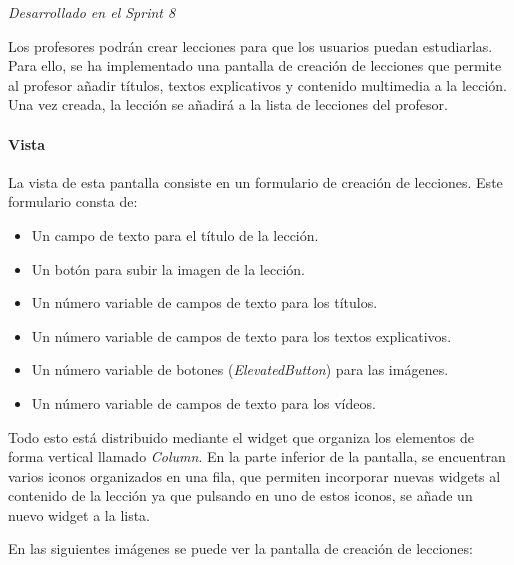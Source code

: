 \textit{Desarrollado en el Sprint 8}

Los profesores podrán crear lecciones para que los usuarios puedan estudiarlas. Para ello, se ha implementado una pantalla de creación de lecciones que permite al profesor añadir títulos, textos explicativos y contenido multimedia a la lección. Una vez creada, la lección se añadirá a la lista de lecciones del profesor.


\paragraph*{Vista}
La vista de esta pantalla consiste en un formulario de creación de lecciones. Este formulario consta de:
\begin{itemize}
  \item Un campo de texto para el título de la lección.
  \item Un botón para subir la imagen de la lección.
  \item Un número variable de campos de texto para los títulos.
  \item Un número variable de campos de texto para los textos explicativos.
  \item Un número variable de botones (\textit{ElevatedButton}) para las imágenes.
  \item Un número variable de campos de texto para los vídeos.
\end{itemize}

\newpage

Todo esto está distribuido mediante el widget que organiza los elementos de forma vertical llamado \textit{Column}. 
En la parte inferior de la pantalla, se encuentran varios iconos organizados en una fila, que permiten incorporar nuevas widgets al contenido de la lección
ya que pulsando en uno de estos iconos, se añade un nuevo widget a la lista.

En las siguientes imágenes se puede ver la pantalla de creación de lecciones:


